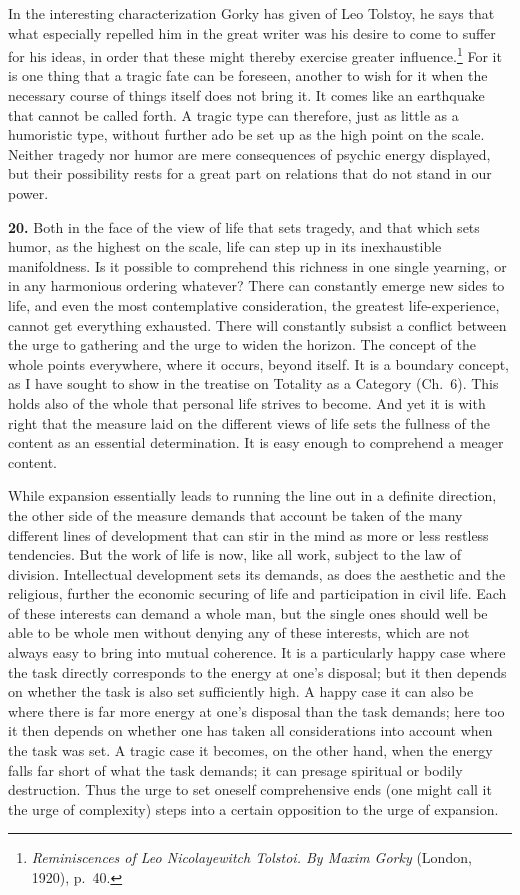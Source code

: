 \documentclass[12pt]{book}
\newcommand{\hnum}[1]{\textbf{#1.}\enspace}
\newcommand{\opage}[1]{\marginnote{\footnotesize\textit{[#1]}}}
\begin{document}
\opage{62}In the interesting characterization Gorky has given of Leo Tolstoy, he says that what especially repelled
him in the great writer was his desire to come to suffer for his ideas, in order that these might thereby
exercise greater influence.\footnote{\textit{Reminiscences of Leo Nicolayewitch Tolstoi. By Maxim Gorky}
(London, 1920), p.\ 40.} For it is one thing that a tragic fate can be foreseen, another to wish for it when
the necessary course of things itself does not bring it. It comes like an earthquake that cannot be called
forth. A tragic type can therefore, just as little as a humoristic type, without further ado be set up as
the high point on the scale. Neither tragedy nor humor are mere consequences of psychic energy displayed,
but their possibility rests for a great part on relations that do not stand in our power.

\hnum{20} Both in the face of the view of life that sets tragedy, and that which sets humor, as the highest
on the scale, life can step up in its inexhaustible manifoldness. Is it possible to comprehend this richness
in one single yearning, or in any harmonious ordering whatever? There can constantly emerge new sides to
life, and even the most contemplative consideration, the greatest life-experience, cannot get everything
exhausted. There will constantly subsist a conflict between the urge to gathering and the urge to widen the
horizon. The concept of the whole points everywhere, where it occurs, beyond itself. It is a boundary
concept, as I have sought to show in the treatise on Totality as a Category (Ch.\ 6). This holds also of the
whole that personal life strives to become. And yet it is with right that the measure laid on the different
views of life sets the fullness of the content as an essential determination. It is easy enough to
comprehend a meager content.

\opage{63}While expansion essentially leads to running the line out in a definite direction, the other side of the
measure demands that account be taken of the many different lines of development that can stir in the mind as
more or less restless tendencies. But the work of life is now, like all work, subject to the law of division.
Intellectual development sets its demands, as does the aesthetic and the religious, further the economic
securing of life and participation in civil life. Each of these interests can demand a whole man, but the
single ones should well be able to be whole men without denying any of these interests, which are not always
easy to bring into mutual coherence. It is a particularly happy case where the task directly corresponds to
the energy at one's disposal; but it then depends on whether the task is also set sufficiently high. A happy
case it can also be where there is far more energy at one's disposal than the task demands; here too it then
depends on whether one has taken all considerations into account when the task was set. A tragic case it
becomes, on the other hand, when the energy falls far short of what the task demands; it can presage
spiritual or bodily destruction. Thus the urge to set oneself comprehensive ends (one might call it the urge
of complexity) steps into a certain opposition to the urge of expansion.
\end{document}
